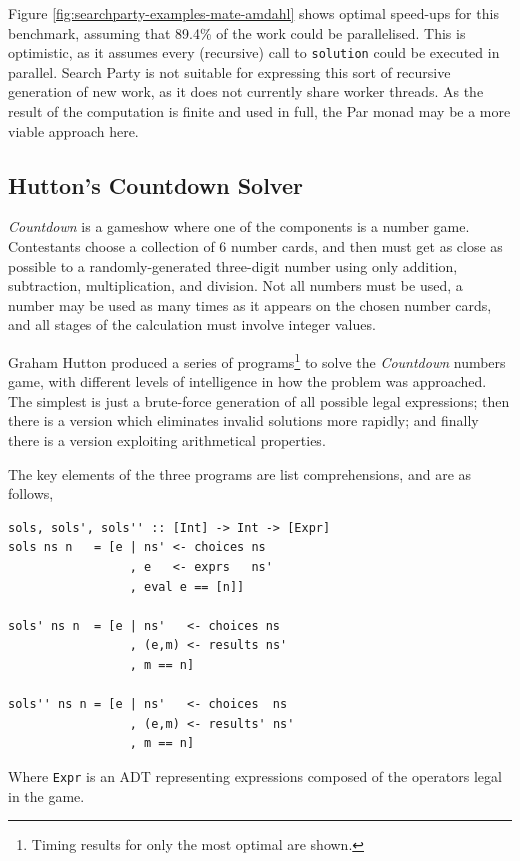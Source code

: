 Figure \ref{fig:searchparty-examples-mate-amdahl} shows optimal
speed-ups for this benchmark, assuming that 89.4\% of the work could
be parallelised. This is optimistic, as it assumes every (recursive)
call to \verb|solution| could be executed in parallel. Search Party is
not suitable for expressing this sort of recursive generation of new
work, as it does not currently share worker threads. As the result of
the computation is finite and used in full, the Par monad may be a
more viable approach here.

\subsection*{Hutton's Countdown Solver}
\label{sec:searchparty-examples-hutton}

\textit{Countdown} is a gameshow where one of the components is a
number game. Contestants choose a collection of 6 number cards, and
then must get as close as possible to a randomly-generated three-digit
number using only addition, subtraction, multiplication, and
division. Not all numbers must be used, a number may be used as many
times as it appears on the chosen number cards, and all stages of the
calculation must involve integer values.

Graham Hutton produced a series of programs\footnote{Timing results
  for only the most optimal are shown.} to solve the
\textit{Countdown} numbers game\cite{hutton}, with different levels of
intelligence in how the problem was approached. The simplest is just a
brute-force generation of all possible legal expressions; then there
is a version which eliminates invalid solutions more rapidly; and
finally there is a version exploiting arithmetical properties.

The key elements of the three programs are list comprehensions, and
are as follows,

\begin{verbatim}
sols, sols', sols'' :: [Int] -> Int -> [Expr]
sols ns n   = [e | ns' <- choices ns
                 , e   <- exprs   ns'
                 , eval e == [n]]

sols' ns n  = [e | ns'   <- choices ns
                 , (e,m) <- results ns'
                 , m == n]

sols'' ns n = [e | ns'   <- choices  ns
                 , (e,m) <- results' ns'
                 , m == n]
\end{verbatim}

Where \verb|Expr| is an ADT representing expressions composed of the
operators legal in the game.

